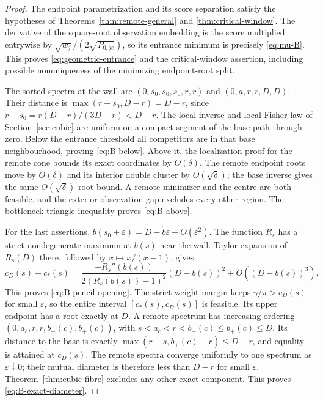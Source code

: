\begin{proof}
The endpoint parametrization and its score separation satisfy the
hypotheses of Theorems~\ref{thm:remote-general} and
\ref{thm:critical-window}. The derivative of the square-root observation
embedding is the score multiplied entrywise by
$\sqrt{w_j}/(2\sqrt{P_{0,je}})$, so its entrance minimum is precisely
\eqref{eq:mu-B}. This proves \eqref{eq:geometric-entrance} and the
critical-window assertion, including possible nonuniqueness of the
minimizing endpoint-root split.

The sorted spectra at the wall are $(0,s_0,s_0,s_0,r,r)$ and
$(0,a,r,r,D,D)$. Their distance is
$\max(r-s_0,D-r)=D-r$, since
$r-s_0=r(D-r)/(3D-r)<D-r$. The local inverse and local Fisher law of
Section~\ref{sec:cubic} are uniform on a compact segment of the base
path through zero. Below the entrance threshold all competitors are in
that base neighbourhood, proving \eqref{eq:B-below}. Above it, the
localization proof for the remote cone bounds its exact coordinates by
$O(\delta)$. The remote endpoint roots move by $O(\delta)$ and its
interior double cluster by $O(\sqrt\delta)$; the base inverse gives the
same $O(\sqrt\delta)$ root bound. A remote minimizer and the centre
are both feasible, and the exterior observation gap excludes every
other region. The bottleneck triangle inequality proves
\eqref{eq:B-above}.

For the last assertions, $b(s_0+\varepsilon)=D-\dot b\varepsilon+
O(\varepsilon^2)$. The function $R_s$ has a strict nondegenerate maximum
at $b(s)$ near the wall. Taylor expansion of $R_s(D)$ there, followed
by $x\mapsto x/(x-1)$, gives
\[
 c_D(s)-c_*(s)=
 \frac{-R_s''(b(s))}{2(R_s(b(s))-1)^2}(D-b(s))^2
                       +O((D-b(s))^3).
\]
This proves \eqref{eq:B-pencil-opening}. The strict weight margin keeps
$\gamma/\pi>c_D(s)$ for small $\varepsilon$, so the entire interval
$[c_*(s),c_D(s)]$ is feasible. Its upper endpoint has a root exactly at
$D$. A remote spectrum has increasing ordering
$(0,a_c,r,r,b_-(c),b_+(c))$, with $s<a_c<r<b_-(c)\le b_+(c)\le D$.
Its distance to the base is exactly
$\max(r-s,b_+(c)-r)\le D-r$, and equality is attained at $c_D(s)$.
The remote spectra converge uniformly to one spectrum as
$\varepsilon\downarrow0$; their mutual diameter is therefore less than
$D-r$ for small $\varepsilon$. Theorem~\ref{thm:cubic-fibre} excludes
any other exact component. This proves \eqref{eq:B-exact-diameter}.
\end{proof}
